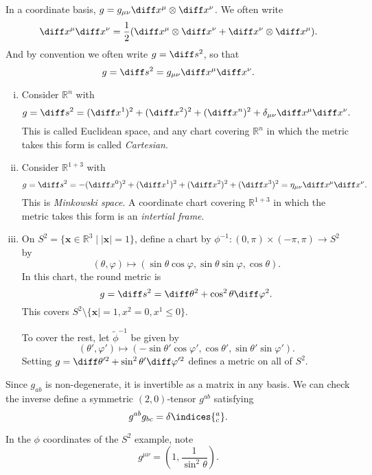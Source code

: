 \documentclass[12pt]{article}
\begin{document}
In a coordinate basis, $g = g_{\mu\nu} \diff x^\mu \otimes \diff x^\nu$. We often write
\[
\diff x^\mu \diff x^\nu = \frac{1}{2} (\diff x^\mu \otimes \diff x^\nu + \diff x^\nu \otimes \diff x^\mu).
\]
And by convention we often write $g = \diff s^2$, so that
\[
g = \diff s^2 = g_{\mu\nu} \diff x^\mu \diff x^\nu.
\]
\begin{exbox}
	\begin{enumerate}[(i)]
		\item Consider $\mathbb{R}^n$ with
			\[
			g = \diff s^2 = (\diff x^1)^2 + (\diff x^2)^2 + (\diff x^n)^2 + \delta_{\mu\nu} \diff x^\mu \diff x^\nu.
			\]
			This is called Euclidean space, and any chart covering $\mathbb{R}^n$ in which the metric takes this form is called \emph{Cartesian}.
		\item Consider $\mathbb{R}^{1+3}$ with
			\[
			g = \diff s^2 = -(\diff x^0)^2 + (\diff x^1)^2 + (\diff x^2)^2 + (\diff x^3)^2 = \eta_{\mu\nu} \diff x^\mu \diff x^\nu.
			\]
			This is \emph{Minkowski space}. A coordinate chart covering $\mathbb{R}^{1+3}$ in which the metric takes this form is an \emph{intertial frame}.
		\item On $S^2 = \{\mathbf{x} \in \mathbb{R}^3 \mid |\mathbf{x}| = 1\}$, define a chart by $\phi^{-1} : (0, \pi) \times (-\pi, \pi) \to S^2$ by
			\[
				(\theta, \varphi) \mapsto (\sin\theta \cos \varphi, \sin \theta \sin \varphi, \cos \theta).
			\]
			In this chart, the round metric is
			\[
			g = \diff s^2 = \diff \theta^2 + \cos^2\theta \diff \varphi^2.
			\]
			This covers $S^2 \setminus \{\mathbf{x}| = 1, x^2 = 0, x^1 \leq 0\}$.

			To cover the rest, let $\tilde \phi^{-1}$ be given by
			\[
				(\theta', \varphi') \mapsto (-\sin\theta' \cos \varphi', \cos \theta', \sin \theta' \sin \varphi').
			\]
			Setting $g = \diff \theta'^2 + \sin^2 \theta' \diff \varphi'^2$ defines a metric on all of $S^2$.
	\end{enumerate}
\end{exbox}

Since $g_{ab}$ is non-degenerate, it is invertible as a matrix in any basis. We can check the inverse define a symmetric $(2, 0)$-tensor $g^{ab}$ satisfying
\[
g^{ab} g_{bc} = \delta\indices{^{a}_{c}}.
\]

\begin{exbox}
	In the $\phi$ coordinates of the $S^2$ example, note
	\[
	g^{\mu\nu} = \left( 1, \frac{1}{\sin^2\theta}\right).
	\]
\end{exbox}
\end{document}
